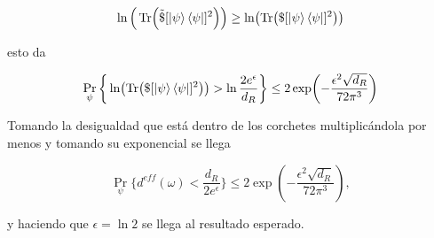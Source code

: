 \begin{enumerate}
\begin{equation}
\ln\Big( \Tr (\tilde{\$}[\ket{\psi}\bra{\psi}]^{2}) \Big) \geq \ln ( \Tr ( \$ [\ket{\psi}\bra{\psi}]^{2}) )
\end{equation}

esto da 

\begin{equation}
\Pr_{\psi}  \bigg \{ \ln (\Tr ( \$ [\ket{\psi}\bra{\psi}]^{2})) > \ln\frac{2e^{\epsilon}}{d_{R}} \bigg \} \leq 2 \exp (-\frac{\epsilon^{2} \sqrt{d_{R}}}{72 \pi^{3}})
\end{equation}

Tomando la desigualdad que está dentro de los corchetes  multiplicándola por menos y tomando su exponencial se llega

\begin{equation}
\Pr_{\psi} \bigg \{  d^{eff}(\omega) < \frac{d_{R}}{2e^{\epsilon}} \bigg \} \leq 2\exp(-\frac{\epsilon^{2}\sqrt{d_{R}}}{72\pi^{3}}),
\end{equation}

y haciendo que $\epsilon=\ln 2$ se llega al resultado esperado.
\\
\end{enumerate}

